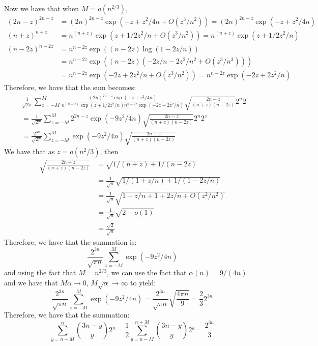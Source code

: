 \documentclass[]{article}
\theoremstyle{definition}
\numberwithin{theorem}{section}
\numberwithin{equation}{section}
\begin{document}
Now we have that when $M = o(n^{2/3})$,
\begin{align*}
	(2n - z)^{2n-z}  &=  (2n)^{2n-z} \exp(-z + z^2/4n + O(z^3/n^2)) = (2n)^{2n-z} \exp(-z + z^2/4n)\\
	(n + z)^{n + z} &= n^{(n + z)} \exp(z + 1/2 z^2/n + O(z^3/n^2)) = n^{(n + z)} \exp(z + 1/2 z^2/n) \\
	(n - 2z)^{n - 2z} &= n^{n -2z} \exp\left( (n - 2z) \log(1 - 2z/n)\right)\\
	&= n^{n -2z} \exp\left( (n - 2z) (-2z/n - 2z^2/n^2 + O(z^3/n^3))\right)\\
	&= n^{n -2z} \exp\left( -2z + 2z^2/n + O(z^3/n^2)\right) = n^{n -2z} \exp( -2z + 2z^2/n)
\end{align*}
Therefore, we have that the sum becomes:
\begin{align*}
	&\frac{1}{\sqrt{2\pi}}\sum_{z = -M}^M \frac{(2n)^{2n-z} \exp(-z + z^2/4n) }{n^{(n + z)} \exp(z + 1/2 z^2/n) n^{n -2z} \exp( -2z + 2z^2/n) } \sqrt{\frac{2n - z}{(n + z)(n - 2z)}} 2^{n} 2^z\\
	&= \frac{1}{\sqrt{2\pi}}\sum_{z = -M}^M 2^{2n-z} \exp(- 9z^2/4n) \sqrt{\frac{2n - z}{(n + z)(n - 2z)}} 2^{n} 2^z\\
	&= \frac{2^{3n}}{\sqrt{2\pi}} \sum_{z = -M}^M  \exp(- 9z^2/4n) \sqrt{\frac{2n - z}{(n + z)(n - 2z)}}
\end{align*}
We have that as $z = o(n^2/3)$, then
\begin{align*}
	\sqrt{\frac{2n - z}{(n + z)(n - 2z)}} &= \sqrt{1/(n + z) + 1/(n - 2z)}\\
	 &= \frac{1}{\sqrt{n}} \sqrt{1/(1 + z/n) + 1/(1 - 2z/n)}\\
	 &= \frac{1}{\sqrt{n}} \sqrt{1 -z/n + 1 + 2z/n + O(z^2/n^2)}\\
	 &= \frac{1}{\sqrt{n}} \sqrt{2 + o(1)}\\
	 &= \frac{\sqrt{2}}{\sqrt{n}} 
\end{align*}
Therefore, we have that the summation is:
\begin{equation}
	\frac{2^{3n}}{\sqrt{\pi n}} \sum_{z = -M}^M  \exp(- 9z^2/4n) 
\end{equation}
and using the fact that $ M = n^{2/3}$, we can use the fact that $\alpha(n) = 9/(4n)$ and we have that $M \alpha \rightarrow 0$, $M \sqrt{\alpha} \rightarrow \infty$ to yield:
\begin{equation}
	\frac{2^{3n}}{\sqrt{\pi n}} \sum_{z = -M}^M  \exp(- 9z^2/4n)  = \frac{2^{3n}}{\sqrt{\pi n}} \sqrt{\frac{4 \pi n}{9}} = \frac{2}{3} 2^{3n}
\end{equation}
Therefore, we have that the summation:
\begin{equation}
	\sum_{y = n - M}^n \binom{3n - y}{y} 2^y = \frac{1}{2} \sum_{y = n - M}^{n + M}\binom{3n - y}{y} 2^y = \frac{2^{3n}}{3}
\end{equation}
\end{document}
